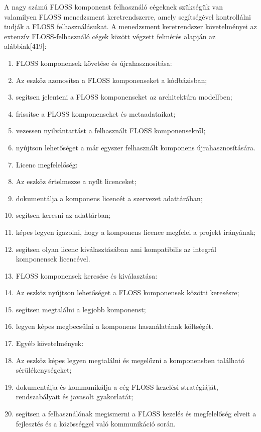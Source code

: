\documentclass[12pt,magyar,a4paper,oneside]{scrreprt}
\begin{document}
A nagy számú FLOSS komponenst felhasználó cégeknek szükségük van
valamilyen FLOSS menedzsment keretrendszerre, amely segítségével
kontrollálni tudják a FLOSS felhasználásukat. A menedzsment
keretrendszer követelményei az extenzív FLOSS-felhasználó cégek között
végzett felmérés alapján az alábbiak{[}419{]}:

\begin{enumerate}
\def\labelenumi{\arabic{enumi}.}
\item
  FLOSS komponensek követése és újrahasznosítása:
\item
  Az eszköz azonosítsa a FLOSS komponenseket a kódbázisban;
\item
  segítsen jelenteni a FLOSS komponenseket az architektúra modellben;
\item
  frissítse a FLOSS komponenseket és metaadataikat;
\item
  vezessen nyilvántartást a felhasznált FLOSS komponensekről;
\item
  nyújtson lehetőséget a már egyszer felhasznált komponens
  újrahasznosítására.
\item
  Licenc megfelelőség:
\item
  Az eszköz értelmezze a nyílt licenceket;
\item
  dokumentálja a komponens licencét a szervezet adattárában;
\item
  segítsen keresni az adattárban;
\item
  képes legyen igazolni, hogy a komponens licence megfelel a projekt
  irányának;
\item
  segítsen olyan licenc kiválasztásában ami kompatibilis az integrál
  komponensek licencével.
\item
  FLOSS komponensek keresése és kiválasztása:
\item
  Az eszköz nyújtson lehetőséget a FLOSS komponensek közötti keresésre;
\item
  segítsen megtalálni a legjobb komponenst;
\item
  legyen képes megbecsülni a komponens használatának költségét.
\item
  Egyéb követelmények:
\item
  Az eszköz képes legyen megtalálni és megelőzni a komponensben
  található sérülékenységeket;
\item
  dokumentálja és kommunikálja a cég FLOSS kezelési stratégiáját,
  rendszabályait és javasolt gyakorlatát;
\item
  segítsen a felhasználónak megismerni a FLOSS kezelés és megfelelőség
  elveit a fejlesztés és a közösséggel való kommunikáció során.
\end{enumerate}
\end{document}
